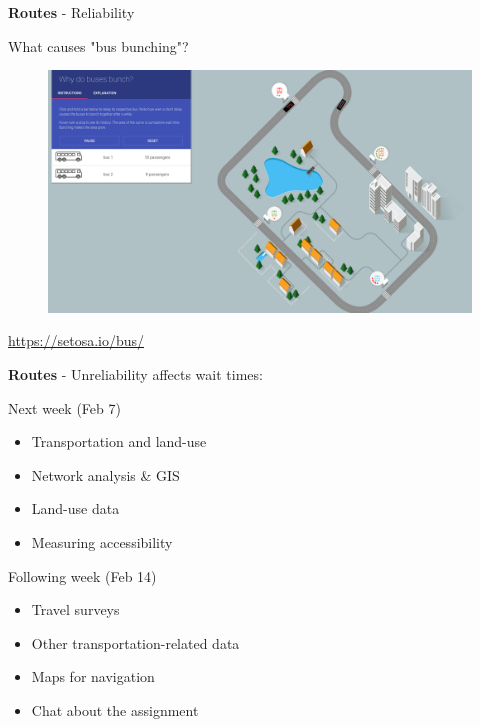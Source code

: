 \documentclass[aspectratio=169]{beamer}
\begin{document}
\begin{frame}
	
	\textbf{Routes} - Reliability
	
	\vspace{2mm}
	
	What causes "bus bunching"?
	
	\begin{figure}
		\centering
		\includegraphics[width=0.8\linewidth]{images/bus-bunching.png}
	\end{figure}
	
	
	\tiny \url{https://setosa.io/bus/}
	
\end{frame}



\begin{frame}
	
	\textbf{Routes} - Unreliability affects wait times:
	
	
	
	
\end{frame}




















\begin{frame}
	
	Next week (Feb 7)
	
	\begin{itemize}
		\item Transportation and land-use
		\item Network analysis \& GIS
		\item Land-use data
		\item Measuring accessibility
	\end{itemize}

	Following week (Feb 14)
	
	\begin{itemize}
		\item Travel surveys
		\item Other transportation-related data
		\item Maps for navigation
		\item Chat about the assignment
	\end{itemize}
	
\end{frame}
\end{document}
